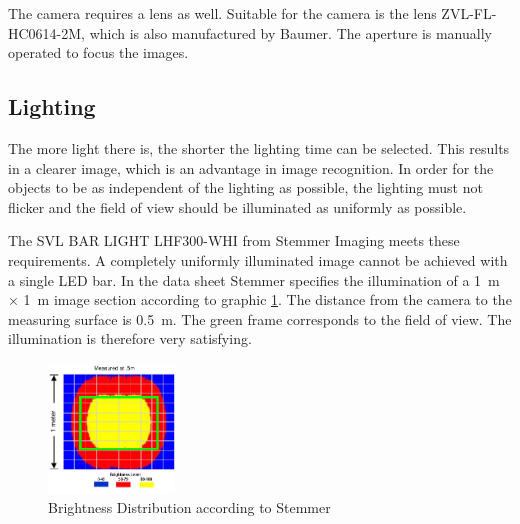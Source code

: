 The camera requires a lens as well.
Suitable for the camera is the lens ZVL-FL-HC0614-2M, which is also manufactured by Baumer.
The aperture is manually operated to focus the images.

\subsection{Lighting}
\label{subsec:Lighting}
The more light there is, the shorter the lighting time can be selected.
This results in a clearer image, which is an advantage in image recognition.
In order for the objects to be as independent of the lighting as possible, the lighting must not flicker and the field of view should be illuminated as uniformly as possible.

The SVL BAR LIGHT LHF300-WHI from Stemmer Imaging meets these requirements.
A completely uniformly illuminated image cannot be achieved with a single LED bar.
In the data sheet Stemmer specifies the illumination of a \SI{1}{m} $\times$ \SI{1}{m} image section according to graphic \ref{fig:lighting_LEDBAR}.
The distance from the camera to the measuring surface is \SI{0.5}{m}.
The green frame corresponds to the field of view.
The illumination is therefore very satisfying.

\begin{figure}[h]
	\centering
	\includegraphics[width=0.3\textwidth]{graphics/brightness_level.pdf}
	\caption{Brightness Distribution according to Stemmer \cite{stemmer_datasheet}}
	\label{fig:lighting_LEDBAR}
\end{figure}